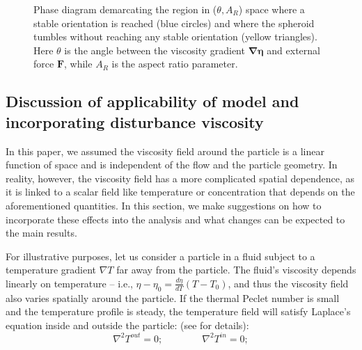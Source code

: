 \documentclass{jfm}
\begin{document}
\begin{figure}
\centering
{}
\hfill
{}

\caption{Phase diagram demarcating the region in ($\theta, A_R$) space where a stable orientation is reached (blue circles) and where the spheroid tumbles without reaching any stable orientation (yellow triangles). Here  ${\theta} $  is the angle between the viscosity gradient  $\boldsymbol{\nabla \eta}$ and external force $\boldsymbol{F}$, while ${A_R}$ is the aspect ratio parameter.}
\label{fig:Random_Phase}
\end{figure}
\subsection{Discussion of applicability of model and incorporating disturbance viscosity} \label{sec:applicability}

In this paper, we assumed the viscosity field around the particle is a linear function of space and is independent of the flow and the particle geometry. In reality, however, the viscosity field has a more complicated spatial dependence, as it is linked to a scalar field like temperature or concentration that depends on the aforementioned quantities. In this section, we make suggestions on how to incorporate these effects into the analysis and what changes can be expected to the main results.

For illustrative purposes, let us consider a particle in a fluid subject to a temperature gradient $\nabla T$ far away from the particle.  The fluid’s viscosity depends linearly on temperature -- i.e., $\eta - \eta_0 = \frac{d \eta}{dT} (T - T_0)$, and thus the viscosity field also varies spatially around the particle.  If the thermal Peclet number is small and the temperature profile is steady, the temperature field will satisfy Laplace’s equation inside and outside the particle:
 (see \citep{Dassios_Ellipsoidal} for details):
\begin{equation}
\nabla^2 T^{out} =0;    \qquad \qquad   \nabla^2 T^{in} =0;
\end{equation}
\end{document}
